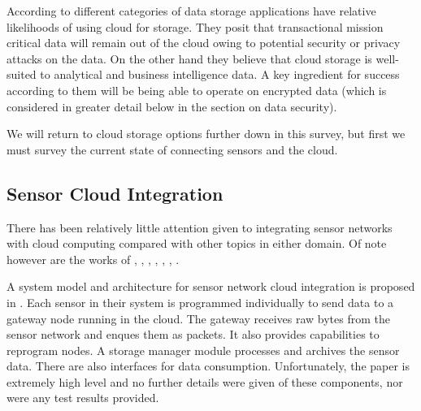 According to \cite{4812386} different categories of data storage applications have relative likelihoods of using cloud for storage. They posit that transactional mission critical data will remain out of the cloud owing to potential security or privacy attacks on the data. On the other hand they believe that cloud storage is well-suited to 
analytical and business intelligence data. A key ingredient for success according to them will be being able to operate on encrypted data (which is considered in greater detail below in the section on data security).

We will return to cloud storage options further down in this survey, but first we must survey the current state of connecting sensors and the cloud.

\subsection{Sensor Cloud Integration}					
There has been relatively little attention given to integrating sensor networks with cloud computing compared with other topics in either domain. Of note however are the works of \cite{briefingscan}, \cite{hassan2009framework}, \cite{melchor2011design}, \cite{Stuedi:2010:WLD:1810931.1810932}, \cite{5678063}, \cite{s111211581}, \cite{Patil2011}.

A system model and architecture for sensor network cloud integration is proposed in \cite{briefingscan}. Each sensor in their system is programmed individually to send data to a gateway node running in the cloud. The gateway receives raw bytes from the sensor network and enques them as packets. It also provides capabilities to reprogram nodes. A storage manager module processes and archives the sensor data. There are also interfaces for data consumption. Unfortunately, the paper is extremely high level and no further details were given of these components, nor were any test results provided.

